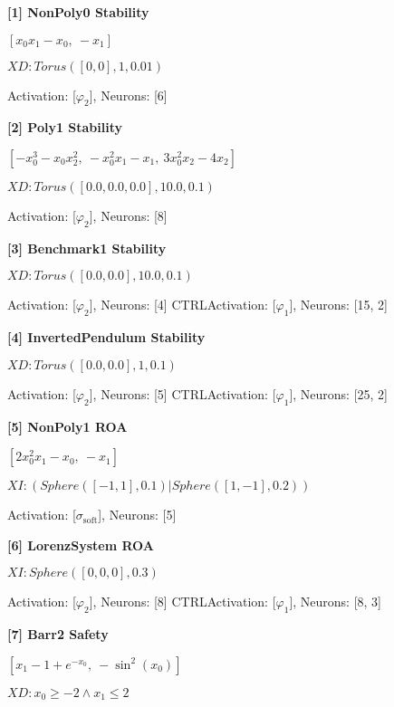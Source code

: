 \textbf{ [1] NonPoly0 Stability }

$\left[ x_{0} x_{1} - x_{0}, \  - x_{1}\right]$ 
 
 $XD: Torus([0, 0], 1, 0.01) $


Activation: [$\varphi_{2}$], Neurons: [6]

\textbf{ [2] Poly1 Stability }

$\left[ - x_{0}^{3} - x_{0} x_{2}^{2}, \  - x_{0}^{2} x_{1} - x_{1}, \  3 x_{0}^{2} x_{2} - 4 x_{2}\right]$ 
 
 $XD: Torus([0.0, 0.0, 0.0], 10.0, 0.1) $


Activation: [$\varphi_{2}$], Neurons: [8]

\textbf{ [3] Benchmark1 Stability }

\left[ u_{0} + x_{0} + x_{1}, \  u_{1} - x_{0} - x_{1}\right] 
 
 $XD: Torus([0.0, 0.0], 10.0, 0.1) $


Activation: [$\varphi_{2}$], Neurons: [4]
CTRLActivation: [$\varphi_{1}$], Neurons: [15, 2]

\textbf{ [4] InvertedPendulum Stability }

 
 $XD: Torus([0.0, 0.0], 1, 0.1) $


Activation: [$\varphi_{2}$], Neurons: [5]
CTRLActivation: [$\varphi_{1}$], Neurons: [25, 2]

\textbf{ [5] NonPoly1 ROA }

$\left[ 2 x_{0}^{2} x_{1} - x_{0}, \  - x_{1}\right]$ 
 
 $XI: (Sphere([-1, 1], 0.1) | Sphere([1, -1], 0.2)) $


Activation: [$\sigma_{\mathrm{soft}}$], Neurons: [5]

\textbf{ [6] LorenzSystem ROA }

\left[ u_{0} - 10.0 x_{0} + 10.0 x_{1}, \  u_{1} - x_{0} x_{2} + 28.0 x_{0} - x_{1}, \  u_{2} + x_{0} x_{1} - 2.66666666666667 x_{2}\right] 
 
 $XI: Sphere([0, 0, 0], 0.3) $


Activation: [$\varphi_{2}$], Neurons: [8]
CTRLActivation: [$\varphi_{1}$], Neurons: [8, 3]

\textbf{ [7] Barr2 Safety }

$\left[ x_{1} - 1 + e^{- x_{0}}, \  - \sin^{2}{\left(x_{0} \right)}\right]$ 
 
 $XD: x_{0} \geq -2 \wedge x_{1} \leq 2 $

